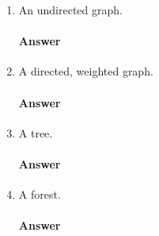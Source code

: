 \documentclass{article}
\begin{document}
\begin{enumerate}
    \item An undirected graph.

        \paragraph{Answer}
        \todo{}

    \item A directed, weighted graph.

        \paragraph{Answer}
        \todo{}

    \item A tree.

        \paragraph{Answer}
        \todo{}

    \item A forest.

        \paragraph{Answer}
        \todo{}

\end{enumerate}
\end{document}

